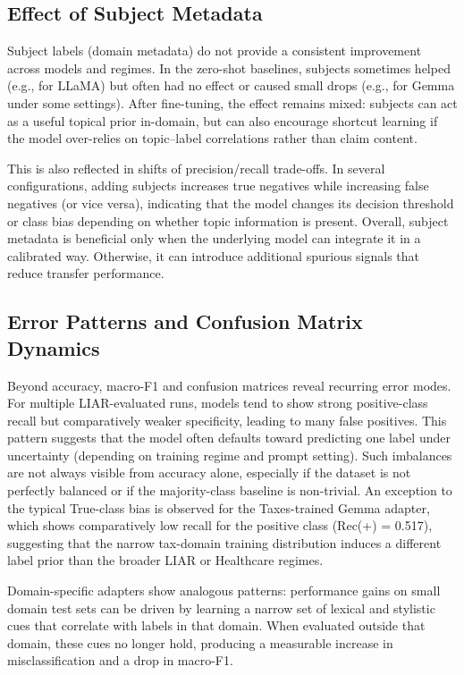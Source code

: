 \subsection{Effect of Subject Metadata}

Subject labels (domain metadata) do not provide a consistent improvement across models and regimes. In the zero-shot baselines, subjects sometimes helped (e.g., for LLaMA) but often had no effect or caused small drops (e.g., for Gemma under some settings). After fine-tuning, the effect remains mixed: subjects can act as a useful topical prior in-domain, but can also encourage shortcut learning if the model over-relies on topic--label correlations rather than claim content.

This is also reflected in shifts of precision/recall trade-offs. In several configurations, adding subjects increases true negatives while increasing false negatives (or vice versa), indicating that the model changes its decision threshold or class bias depending on whether topic information is present. Overall, subject metadata is beneficial only when the underlying model can integrate it in a calibrated way. Otherwise, it can introduce additional spurious signals that reduce transfer performance.

\subsection{Error Patterns and Confusion Matrix Dynamics}

Beyond accuracy, macro-F1 and confusion matrices reveal recurring error modes. For multiple LIAR-evaluated runs, models tend to show strong positive-class recall but comparatively weaker specificity, leading to many false positives. This pattern suggests that the model often defaults toward predicting one label under uncertainty (depending on training regime and prompt setting). Such imbalances are not always visible from accuracy alone, especially if the dataset is not perfectly balanced or if the majority-class baseline is non-trivial. An exception to the typical True-class bias is observed for the Taxes-trained Gemma adapter, which shows comparatively low recall for the positive class (Rec(+) = 0.517), suggesting that the narrow tax-domain training distribution induces a different label prior than the broader LIAR or Healthcare regimes.

Domain-specific adapters show analogous patterns: performance gains on small domain test sets can be driven by learning a narrow set of lexical and stylistic cues that correlate with labels in that domain. When evaluated outside that domain, these cues no longer hold, producing a measurable increase in misclassification and a drop in macro-F1.


